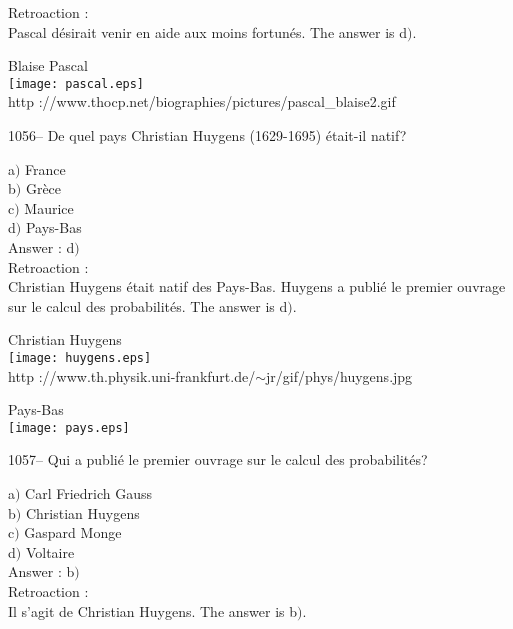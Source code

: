 ﻿\documentclass[letterpaper, 12pt]{article}
\begin{document}
Retroaction : \\
Pascal d\'esirait venir en aide aux moins fortun\'es.
The answer is d$)$.\\

        \begin{center}
        Blaise Pascal\\
    \texttt{[image: pascal.eps]}\\
        {\footnotesize http
://www.thocp.net/biographies/pictures/pascal\_blaise2.gif}
    \end{center}

1056-- De quel pays Christian Huygens (1629-1695) \'etait-il natif?

a$)$ France \\
b$)$ Gr\`ece  \\
c$)$ Maurice  \\
d$)$ Pays-Bas \\

Answer : d$)$\\

Retroaction : \\
Christian Huygens \'etait natif des Pays-Bas. Huygens a publi\'e le
premier ouvrage sur le calcul des probabilit\'es.
The answer is d$)$.\\

        \begin{center}
        Christian Huygens\\
    \texttt{[image: huygens.eps]}\\
        {\footnotesize http
://www.th.physik.uni-frankfurt.de/$\sim$jr/gif/phys/huygens.jpg}
    \end{center}

        \begin{center}
        Pays-Bas\\
    \texttt{[image: pays.eps]}\\
    \end{center}

1057-- Qui a publi\'e le premier ouvrage sur le calcul des
probabilit\'es?

a$)$ Carl Friedrich Gauss \\
b$)$ Christian Huygens \\
c$)$ Gaspard Monge  \\
d$)$ Voltaire  \\

Answer : b$)$\\

Retroaction : \\
Il s'agit de Christian Huygens.
The answer is b$)$.\\
\end{document}
